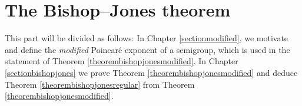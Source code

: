\part{The Bishop--Jones theorem}
\label{partbishopjones}
This part will be divided as follows: In Chapter \ref{sectionmodified}, we motivate and define the \emph{modified} Poincar\'e exponent of a semigroup, which is used in the statement of Theorem \ref{theorembishopjonesmodified}. In Chapter \ref{sectionbishopjones} we prove Theorem \ref{theorembishopjonesmodified} and deduce Theorem \ref{theorembishopjonesregular} from Theorem \ref{theorembishopjonesmodified}.